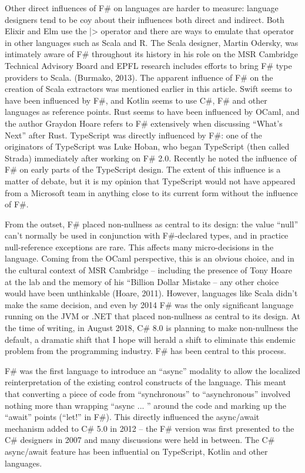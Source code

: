 \documentclass[acmsmall,review]{acmart}\settopmatter{printfolios=true,printccs=false,printacmref=false}
\begin{document}
Other direct influences of F\# on languages are harder to measure: language designers tend to be coy about their influences both direct and indirect. Both Elixir and Elm use the |> operator and there are ways to emulate that operator in other languages such as Scala and R. The Scala designer, Martin Odersky, was intimately aware of F\# throughout its history in his role on the MSR Cambridge Technical Advisory Board and EPFL research includes efforts to bring F\# type providers to Scala. (Burmako, 2013).  The apparent influence of F\# on the creation of Scala extractors was mentioned earlier in this article. Swift seems to have been influenced by F\#, and Kotlin seems to use C\#, F\# and other languages as reference points.  Rust seems to have been influenced by OCaml, and the author Graydon Hoare refers to F\# extensively when discussing “What’s Next” after Rust.  TypeScript was directly influenced by F\#: one of the originators of TypeScript was Luke Hoban, who began TypeScript (then called Strada) immediately after working on F\# 2.0. Recently he noted the influence of F\# on early parts of the TypeScript design.   The extent of this influence is a matter of debate, but it is my opinion that TypeScript would not have appeared from a Microsoft team in anything close to its current form without the influence of F\#.

From the outset, F\# placed non-nullness as central to its design: the value “null” can’t normally be used in conjunction with F\#-declared types, and in practice null-reference exceptions are rare.   This affects many micro-decisions in the language. Coming from the OCaml perspective, this is an obvious choice, and in the cultural context of MSR Cambridge – including the presence of Tony Hoare at the lab and the memory of his “Billion Dollar Mistake – any other choice would have been unthinkable (Hoare, 2011).  However, languages like Scala didn’t make the same decision, and even by 2014 F\# was the only significant language running on the JVM or .NET that placed non-nullness as central to its design. At the time of writing, in August 2018, C\# 8.0 is planning to make non-nullness the default, a dramatic shift that I hope will herald a shift to eliminate this endemic problem from the programming industry. F\# has been central to this process.

F\# was the first language to introduce an “async” modality to allow the localized reinterpretation of the existing control constructs of the language. This meant that converting a piece of code from “synchronous” to “asynchronous” involved nothing more than wrapping “async { ... }” around the code and marking up the “await” points (“let!” in F\#).   This directly influenced the async/await mechanism added to C\# 5.0 in 2012 – the F\# version was first presented to the C\# designers in 2007 and many discussions were held in between.  The C\# async/await feature has been influential on TypeScript, Kotlin and other languages.   
\end{document}
